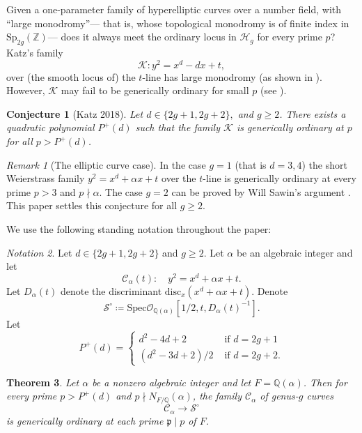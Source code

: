 \documentclass{amsart}
\theoremstyle{plain}
\newtheorem{theorem}{Theorem}[section]
\newtheorem{conjecture}[theorem]{Conjecture}
\theoremstyle{remark}
\newtheorem*{remark*}{Remark}
\theoremstyle{remark}
\newtheorem{notation}[theorem]{Notation}
\newcommand{\fp}{\mathfrak{p}}
\newcommand{\cS}{\mathcal{S}}
\newcommand{\cK}{\mathcal{K}}
\newcommand{\cO}{\mathcal{O}}
\newcommand{\cH}{\mathcal{H}}
\newcommand{\cC}{\mathcal{C}}
\newcommand{\Spec}{\mathrm{Spec}}
\newcommand{\Sp}{\mathrm{Sp}}
\newcommand{\disc}{\mathrm{disc}}
\newcommand{\0}{\mathbf{0}}
\newcommand{\1}{\mathbf{1}}
\newcommand{\Q}{\mathbb{Q}}
\newcommand{\Z}{\mathbb{Z}}
\begin{document}
Given a one-parameter family of hyperelliptic curves over a number field,
with ``large monodromy''--- that is, whose topological monodromy is of finite index in $\Sp_{2g}(\Z)$---  does it always meet the ordinary locus in $\cH_g$ for every prime $p$? 
Katz's family $$\cK: y^2=x^d-dx+t,$$ 
over (the smooth locus of) the $t$-line has large monodromy 
(as shown in \cite{Kat14}). However, 
$\cK$ may fail to be generically ordinary for small $p$ 
(see \cite{Kat18}).
   
\begin{conjecture}[Katz 2018]
\label{Con:Katz}
Let $d\in\{2g+1,2g+2\},$ and $g\ge 2$.
There exists a quadratic polynomial $P^+(d)$ 
such that the family $\cK$ is generically ordinary 
at $p$ for all $p>P^+(d)$. 
\end{conjecture}

\begin{remark*}[The elliptic curve case]
In the case $g=1$ (that is $d=3,4$) the short Weierstrass family 
$y^2=x^d+\alpha x+t$ over the $t$-line 
is generically ordinary at every prime $p>3$ and $p\nmid \alpha$.
The case $g=2$ can be proved by Will Sawin's argument 
 \cite{Saw16}. 
This paper settles this conjecture for all $g\ge 2$.
\end{remark*}

We use the following standing notation throughout the paper:

\begin{notation}\label{N:main}
Let $d\in\{2g+1,2g+2\}$ and $g\ge 2$. 
Let $\alpha$ be an algebraic integer 
and let 
\begin{equation*}
        \cC_\alpha(t):\quad y^2=x^d+\alpha x+t.
\end{equation*}
Let $D_\alpha(t)$ denote 
the discriminant $\disc_x(x^d+\alpha x+t)$.
Denote 
$$
\cS^\circ\coloneqq \Spec \cO_{\Q(\alpha)}[1/2,t,D_\alpha(t)^{-1}].
$$
Let   
$$
P^+(d)=
\begin{cases}
d^2-4d+2 & \mbox{ if }d=2g+1\\
(d^2-3d+2)/2 & \mbox{ if }d=2g+2.
\end{cases}
$$
\end{notation}

\begin{theorem}\label{T:main}
Let $\alpha$ be a nonzero algebraic integer and let $F=\Q(\alpha)$.
Then for every prime $p>P^+(d)$ and $p\nmid N_{F/\Q}(\alpha)$, 
the family $\cC_\alpha$ of genus-$g$ curves 
$$
\cC_\alpha \longrightarrow  \cS^\circ
$$
is generically ordinary at each prime $\fp\mid p$ of $F$. 
\end{theorem}
\end{document}
